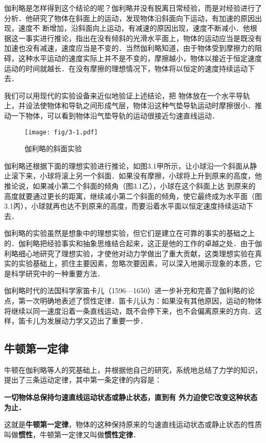 伽利略是怎样得到这个结论的呢？伽利略并没有脱离日常经验，而是对经验进行了分析．他研究了物体在斜面上的运动，发现物体沿斜面向下运动，有加速的原因出现，速度不
断增加，沿斜面向上运动，有减速的原因出现，速度不断减小．他根据这一事实进行推论，指出在没有倾斜的光滑水平面上，物体的运动应当是既没有加速也没有减速，速度应当是不变的．当然伽利略知道，由于物体受到摩擦力的阻碍，这种水平运动的速度实际上并不是不变的，摩擦越小，物体以接近于恒定速度运动的时间就越长．在没有摩擦的理想情况下，物体将以恒定的速度持续运动下去．

我们可以用现代的实验设备来近似地验证上述结论，把
物体放在一个水平导轨上，并设法使物体和导轨之间形成气层，物体沿这种气垫导轨运动时摩擦很小．推动一下物体，可以看到物体沿气垫导轨的运动很接近匀速直线运动．

\begin{figure}[htp]
\centering
\texttt{[image: fig/3-1.pdf]}
\caption{伽利略的斜面实验}
\end{figure}

伽利略还根据下面的理想实验进行推论，如图3.1甲所示，让小球沿一个斜面从静止滚下来，小球将滚上另一个斜面．如果没有摩擦，小球将上升到原来的高度，他推论说，如果减小第二个斜面的倾角（图3.1乙），小球在这个斜面上达
到原来的高度就要通过更长的距寓，继续减小第二个斜面的倾角，使它最终成为水平面（图3.1丙），小球就再也达不到原来的高度，而要沿着水平面以恒定速度持续运动下去．

伽利略的实验虽然是想象中的理想实验，但它们是建立在可靠的事实的基础之上的．伽利略把经验事实和抽象思维结合起来，这正是他的工作的卓越之处．由于伽利略细心地研究了理想实验，才使他对动力学做出了重大贡献，这类理想实验在真实的实验基础上，抓住主要因素，忽略次要因素，可以深入地揭示现象的本质，它是科学研究中的一种重要方法．

伽利略时代的法国科学家笛卡儿（1596—1650）进一步补充和完善了伽利略的论点，第一次明确地表述了惯性定律．笛卡儿认为：如果没有其他原因，运动的物体将继续以同一速度沿着一条直线运动，既不会停下来，也不会偏离原来的方向．这样，笛卡儿为发展动力学又迈出了重要一步．

\subsection{牛顿第一定律} 
牛顿在伽利略等人的究基础上，并根据他自己的研究，系统地总结了力学的知识，提出了三条运动定律，其中第一条定律的内容是：

\textbf{一切物体总保持匀速直线运动状态或静止状态，直到有
外力迫使它改变这种状态为止．}

这就是\textbf{牛顿第一定律}，物体的这种保持原来的匀速直线运动状态或静止状态的性质叫做\textbf{惯性}，牛顿第一定律又叫做\textbf{惯性定律}．

